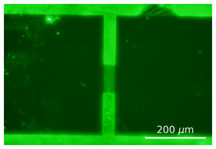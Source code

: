 \documentclass[
  a4paper,
]{scrbook}
\begin{document}
\begin{figure}
\begin{minipage}[t]{0.47\linewidth}
{{\includegraphics{figures/ch7/modified_GFPOR_PBASE_10sexposure_20X_mediumcontrast_ch1_231019_2.png}

}

}

\subcaption{\label{fig-PBASE-GFP-OR-ch1-zoom}}
\end{minipage}%
\newline
\begin{minipage}[t]{0.47\linewidth}

{\centering 


}

\subcaption{\label{fig-GFP-OR-ch6}}
\end{minipage}%
%
\begin{minipage}[t]{0.05\linewidth}


\end{minipage}
\end{figure}
\end{document}
